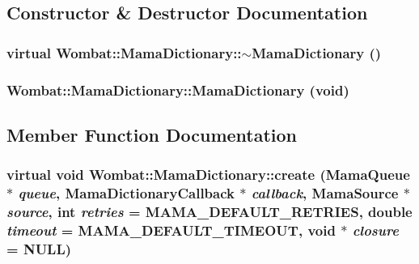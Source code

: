 \subsection{Constructor \& Destructor Documentation}
\hypertarget{classWombat_1_1MamaDictionary_ae6c0c403cedf5dfa0a2711e4aab7bce0}{
\subsubsection[{$\sim$MamaDictionary}]{\setlength{\rightskip}{0pt plus 5cm}virtual Wombat::MamaDictionary::$\sim$MamaDictionary ()}}
\label{classWombat_1_1MamaDictionary_ae6c0c403cedf5dfa0a2711e4aab7bce0}
\hypertarget{classWombat_1_1MamaDictionary_a5afed0397d09f3339af2d08423ba4884}{
\subsubsection[{MamaDictionary}]{\setlength{\rightskip}{0pt plus 5cm}Wombat::MamaDictionary::MamaDictionary (void)}}
\label{classWombat_1_1MamaDictionary_a5afed0397d09f3339af2d08423ba4884}


\subsection{Member Function Documentation}
\hypertarget{classWombat_1_1MamaDictionary_ab1f2b4e27ccb5f26c2359e6cf5a7e935}{
\subsubsection[{create}]{\setlength{\rightskip}{0pt plus 5cm}virtual void Wombat::MamaDictionary::create ({\bf MamaQueue} $\ast$ {\em queue}, \/  {\bf MamaDictionaryCallback} $\ast$ {\em callback}, \/  {\bf MamaSource} $\ast$ {\em source}, \/  int {\em retries} = {\ttfamily MAMA\_\-DEFAULT\_\-RETRIES}, \/  double {\em timeout} = {\ttfamily MAMA\_\-DEFAULT\_\-TIMEOUT}, \/  void $\ast$ {\em closure} = {\ttfamily NULL})}}
\label{classWombat_1_1MamaDictionary_ab1f2b4e27ccb5f26c2359e6cf5a7e935}


